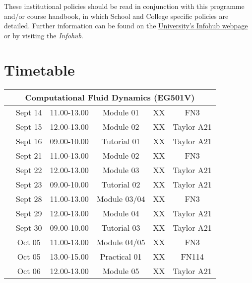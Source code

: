 \documentclass[12pts,a4paper,amsmath,amssymb,floatfix]{article}%
\begin{document}
These institutional policies should be read in conjunction with this programme and/or course handbook, in which School and College specific policies are detailed. Further information can be found on the \href{http:www.abdn.ac.uk/infohub/}{University's Infohub webpage} or by visiting the {\it Infohub}.

\clearpage




\section{Timetable}\scriptsize

\begin{center}
\begin{tabular}{||c||c|c|c|c|c||}
\hline\hline
\multicolumn{6}{||c||}{Computational Fluid Dynamics (EG501V)} \\
\hline\hline
\multirow{3}{*}{\color{red}{Week 7}}  & Sept 14   & 11.00-13.00 & Module 01   & XX  & FN3   \\
                                      & Sept 15   & 12.00-13.00 & Module 02   & XX  & Taylor A21 \\
                                      & Sept 16   & 09.00-10.00 & Tutorial 01 & XX  & Taylor A21 \\
\hline
\multirow{3}{*}{\color{red}{Week 8}}  & Sept 21   & 11.00-13.00 & Module 02   & XX  & FN3 \\
                                      & Sept 22   & 12.00-13.00 & Module 03   & XX  & Taylor A21 \\
                                      & Sept 23   & 09.00-10.00 & Tutorial 02 & XX  & Taylor A21 \\
\hline
\multirow{3}{*}{\color{red}{Week 9}}  & Sept 28   & 11.00-13.00 & Module 03/04 & XX  & FN3 \\
                                      & Sept 29   & 12.00-13.00 & Module 04   & XX  & Taylor A21 \\
                                      & Sept 30   & 09.00-10.00 & Tutorial 03 & XX  & Taylor A21 \\
\hline
\multirow{3}{*}{\color{red}{Week 10}} & Oct 05    & 11.00-13.00 & Module 04/05 & XX & FN3 \\
                                      & Oct 05    & 13.00-15.00 & Practical 01 & XX & FN114 \\
                                      & Oct 06    & 12.00-13.00 & Module 05   & XX  & Taylor A21 \\

\end{tabular}
\end{center}
\end{document}
